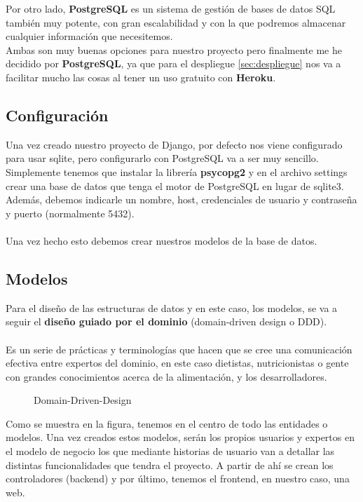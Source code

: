 Por otro lado, \textbf{PostgreSQL} es un sistema de gestión de bases de datos SQL también muy potente, con gran escalabilidad y con la que podremos almacenar cualquier información que necesitemos.\\

Ambas son muy buenas opciones para nuestro proyecto pero finalmente me he decidido por \textbf{PostgreSQL}, ya que para el despliegue \ref*{sec:despliegue} nos va a facilitar mucho las cosas
al tener un uso gratuito con \textbf{Heroku}.

\subsection{Configuración}

Una vez creado nuestro proyecto de Django, por defecto nos viene configurado para usar sqlite, pero configurarlo con PostgreSQL va a ser muy sencillo.
Simplemente tenemos que instalar la librería \textbf{psycopg2} y en el archivo settings crear una base de datos que tenga el motor de PostgreSQL en lugar de sqlite3.
Además, debemos indicarle un nombre, host, credenciales de usuario y contraseña y puerto (normalmente 5432).\\ \\

Una vez hecho esto debemos crear nuestros modelos de la base de datos.

\subsection{Modelos}

Para el diseño de las estructuras de datos y en este caso, los modelos, se va a seguir el \textbf{diseño guiado por el dominio} \cite{DDD} (domain-driven design o DDD).\\ \\

Es un serie de prácticas y terminologías que hacen que se cree una comunicación efectiva entre expertos del dominio, en este caso dietistas, nutricionistas o gente con 
grandes conocimientos acerca de la alimentación, y los desarrolladores.\\

\begin{figure}[H]
  \centering
  \noindent{}
  \caption{Domain-Driven-Design}
\end{figure}

Como se muestra en la figura, tenemos en el centro de todo las entidades o modelos. Una vez creados estos modelos, serán los propios usuarios y expertos en el modelo de negocio los que
mediante historias de usuario van a detallar las distintas funcionalidades que tendra el proyecto. A partir de ahí se crean los controladores (backend) y por último, tenemos el frontend,
en nuestro caso, una web.\\

